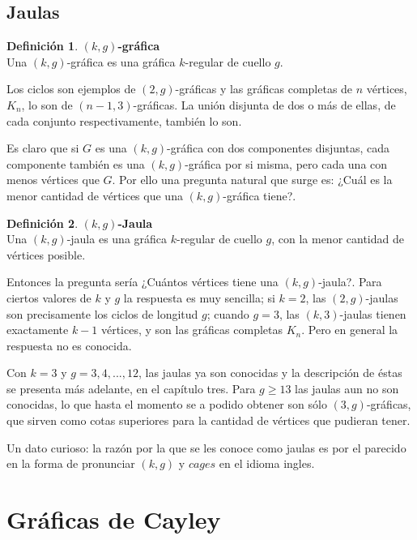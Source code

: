 \documentclass[12pt]{book}
\theoremstyle{definition}
\newtheorem{definition}{Definición}
\begin{document}
\subsection{Jaulas}

\begin{definition}\textbf{$(k,g)$-gráfica}\\
  Una $(k,g)$-gráfica es una gráfica $k$-regular de cuello $g$.
\end{definition}

Los ciclos son ejemplos de $(2,g)$-gráficas y las gráficas completas de $n$ vértices, $K_n$,
lo son de $(n-1,3)$-gráficas. La unión disjunta de dos o más de
ellas, de cada conjunto respectivamente, también lo son.

Es claro que si $G$ es una $(k,g)$-gráfica con dos componentes
disjuntas, cada componente también es una $(k,g)$-gráfica por si
misma, pero cada una con menos vértices que $G$. Por ello una pregunta
natural que surge es: ¿Cuál es la menor cantidad de vértices que una
$(k,g)$-gráfica tiene?.

\begin{definition}\textbf{$(k,g)$-Jaula}\\
  Una $(k,g)$-jaula es una gráfica $k$-regular de cuello $g$, con la
  menor cantidad de vértices posible.
\end{definition}

Entonces la pregunta sería ¿Cuántos vértices tiene una
$(k,g)$-jaula?. Para ciertos valores de $k$ y $g$ la respuesta es muy
sencilla; si $k=2$, las $(2,g)$-jaulas son precisamente los ciclos de
longitud $g$; cuando $g=3$, las $(k,3)$-jaulas tienen exactamente
$k-1$ vértices, y son las gráficas completas $K_n$. Pero en general la respuesta no es conocida.

Con $k=3$ y $g=3,4,...,12$, las jaulas ya son conocidas y la
descripción de éstas se presenta más adelante, en el capítulo tres. Para
$g\geq 13$ las jaulas aun no son conocidas, lo que hasta el momento se a podido obtener son sólo
$(3,g)$-gráficas, que sirven como cotas superiores para la cantidad de
vértices que pudieran tener.

Un dato curioso: la razón por la que se les conoce como jaulas es por
el parecido en la forma de pronunciar $(k,g)$ y $cages$ en el idioma
ingles.
 


\section{Gráficas de Cayley}
\end{document}
